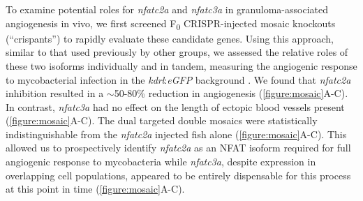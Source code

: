 To examine potential roles for \textit{nfatc2a} and \textit{nfatc3a} in granuloma-associated angiogenesis in vivo, we first screened F\textsubscript{0} CRISPR-injected mosaic knockouts (``crispants'') to rapidly evaluate these candidate genes. Using this approach, similar to that used previously by other groups, we assessed the relative roles of these two isoforms individually and in tandem, measuring the angiogenic response to mycobacterial infection in the \textit{kdrl}:\textit{eGFP} background \citep{Jao2013, Hoshijima2016, Wu2018, Hoshijima2019, Kroll2021}. We found that \textit{nfatc2a} inhibition resulted in a $\sim$50-80\% reduction in angiogenesis (\autoref{figure:mosaic}A-C). In contrast, \textit{nfatc3a} had no effect on the length of ectopic blood vessels present (\autoref{figure:mosaic}A-C). The dual targeted double mosaics were statistically indistinguishable from the \textit{nfatc2a} injected fish alone (\autoref{figure:mosaic}A-C). This allowed us to prospectively identify \textit{nfatc2a} as an NFAT isoform required for full angiogenic response to mycobacteria while \textit{nfatc3a}, despite expression in overlapping cell populations, appeared to be entirely dispensable for this process at this point in time (\autoref{figure:mosaic}A-C). 

